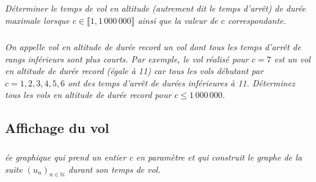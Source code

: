 \begin{multicols}{2}
\subparagraph{}\textit{Déterminer le temps de vol en altitude (autrement dit le temps d’arrêt) de durée maximale lorsque $c \in \llbracket 1,1\,000\,000\rrbracket$ 
ainsi que la valeur de $c$ correspondante.}


\subparagraph{}\textit{On appelle vol en altitude de durée record un vol dont tous les temps d’arrêt de rangs inférieurs sont plus courts. Par exemple, le vol réalisé pour $c = 7$ est un vol en altitude de durée record (égale à 11) car tous les vols débutant
par $c = 1,2,3,4,5,6$ ont des temps d’arrêt de durées inférieures à 11. Déterminez tous les vols en altitude de durée record
pour $c \leq 1\,000\,000$.}

\subsection*{Affichage du vol}
\subparagraph{}\textit{ée graphique qui prend un entier c en paramètre et qui construit le graphe de
la suite $\left(u_n\right)_{n\in \mathbb{N}}$ durant son temps de vol.}


\end{multicols}